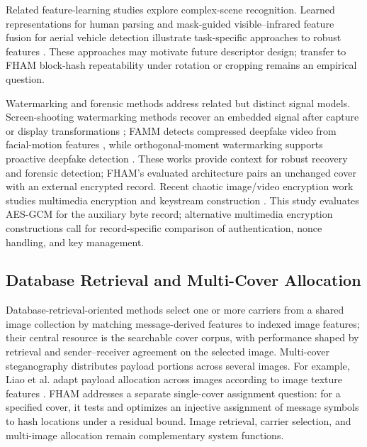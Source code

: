 \documentclass[preprint,12pt]{elsarticle}
\theoremstyle{plain}
\begin{document}
Related feature-learning studies explore complex-scene recognition. Learned
representations for human parsing and mask-guided visible--infrared feature
fusion for aerial vehicle detection illustrate task-specific approaches to
robust features \cite{liu2024humanparsing,wang2024maskmamba}. These approaches
may motivate future descriptor design; transfer to FHAM block-hash
repeatability under rotation or cropping remains an empirical question.

Watermarking and forensic methods address related but distinct signal models.
Screen-shooting watermarking methods recover an embedded signal after capture
or display transformations \cite{fu2025waverecovery,li2024screenshooting};
FAMM detects compressed deepfake video from facial-motion features
\cite{liao2023famm}, while orthogonal-moment watermarking supports proactive
deepfake detection \cite{wang2026orthowatermark}. These works provide context
for robust recovery and forensic detection; FHAM's evaluated architecture
pairs an unchanged cover with an external encrypted record. Recent chaotic
image/video encryption work studies multimedia encryption and keystream
construction \cite{gao2025memristive,gao2025story,gao2025chaosreview}.
This study evaluates AES-GCM for the auxiliary byte record; alternative
multimedia encryption constructions call for record-specific comparison of
authentication, nonce handling, and key management.

\subsection{Database Retrieval and Multi-Cover Allocation}
Database-retrieval-oriented methods select one or more carriers from a shared
image collection by matching message-derived features to indexed image
features; their central resource is the searchable cover corpus, with
performance shaped by retrieval and sender--receiver agreement on the selected
image. Multi-cover steganography distributes payload portions across several
images. For example, Liao et al. adapt payload allocation across images
according to image texture features \cite{liao2022adaptivepayload}. FHAM
addresses a separate single-cover assignment question: for a specified cover,
it tests and optimizes an injective assignment of message symbols to hash
locations under a residual bound. Image retrieval, carrier selection, and
multi-image allocation remain complementary system functions.
\end{document}
